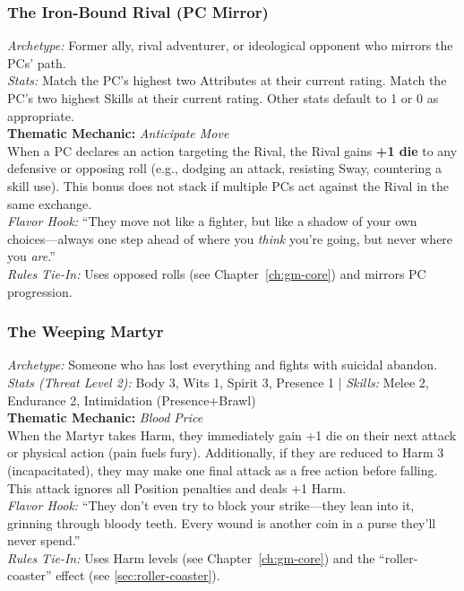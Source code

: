 \subsubsection{The Iron-Bound Rival (PC Mirror)}
\textit{Archetype:} Former ally, rival adventurer, or ideological opponent who mirrors the PCs' path.\\
\textit{Stats:} Match the PC's highest two Attributes at their current rating. Match the PC's two highest Skills at their current rating. Other stats default to 1 or 0 as appropriate.\\
\textbf{Thematic Mechanic:} \textit{Anticipate Move} \\
When a PC declares an action targeting the Rival, the Rival gains \textbf{+1 die} to any defensive or opposing roll (e.g., dodging an attack, resisting Sway, countering a skill use). This bonus does not stack if multiple PCs act against the Rival in the same exchange.\\
\textit{Flavor Hook:} ``They move not like a fighter, but like a shadow of your own choices---always one step ahead of where you \textit{think} you're going, but never where you \textit{are}.''\\
\textit{Rules Tie-In:} Uses opposed rolls (see Chapter~\ref{ch:gm-core}) and mirrors PC progression.

\subsubsection{The Weeping Martyr}
\textit{Archetype:} Someone who has lost everything and fights with suicidal abandon.\\
\textit{Stats (Threat Level 2):} Body 3, Wits 1, Spirit 3, Presence 1 \quad | \quad \textit{Skills:} Melee 2, Endurance 2, Intimidation (Presence+Brawl)\\
\textbf{Thematic Mechanic:} \textit{Blood Price} \\
When the Martyr takes Harm, they immediately gain +1 die on their next attack or physical action (pain fuels fury). Additionally, if they are reduced to Harm 3 (incapacitated), they may make one final attack as a free action before falling. This attack ignores all Position penalties and deals +1 Harm.\\
\textit{Flavor Hook:} ``They don't even try to block your strike---they lean into it, grinning through bloody teeth. Every wound is another coin in a purse they'll never spend.''\\
\textit{Rules Tie-In:} Uses Harm levels (see Chapter~\ref{ch:gm-core}) and the ``roller-coaster'' effect (see \ref{sec:roller-coaster}).

